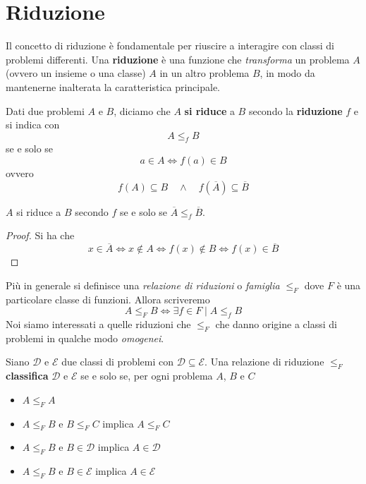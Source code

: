 \section{Riduzione}
Il concetto di riduzione è fondamentale per riuscire a interagire
con classi di problemi differenti. Una \textbf{riduzione} è una
funzione che \emph{transforma} un problema $A$ (ovvero un insieme
o una classe) $A$ in un altro problema $B$, in modo da mantenerne
inalterata la caratteristica principale.

\begin{definition} \label{def: riduzione}
	Dati due problemi $A$ e $B$, diciamo che $A$ \textbf{si riduce}
	a $B$ secondo la \textbf{riduzione} $f$ e si indica con
	\[ A \leq_f B \]
	se e solo se
	\[ a \in A \iff f(a) \in B \]
	ovvero
	\[
		f(A) \subseteq B \quad \land
		\quad f(\overline{A}) \subseteq \overline{B}
	\]
\end{definition}

\begin{property}
	$A$ si riduce a $B$ secondo $f$ se e solo se
	$\overline{A} \leq_f \overline{B}$.
	\begin{proof}
		Si ha che
		\[
			x \in \overline{A} \iff x \notin A \iff
			f(x) \notin B \iff f(x) \in \overline{B}
		\]
	\end{proof}
\end{property}

Più in generale si definisce una \emph{relazione di riduzioni}
o \emph{famiglia} $\leq_F$ dove $F$ è una particolare classe di
funzioni. Allora scriveremo
\[ A \leq_F B \iff \exists f \in F \mid A \leq_f B \]
Noi siamo interessati a quelle riduzioni che $\leq_F$ che danno
origine a classi di problemi in qualche modo \emph{omogenei}.

\begin{lemma} \label{def: classificazione}
	Siano $\mathcal{D}$ e $\mathcal{E}$ due classi di problemi
	con $\mathcal{D} \subseteq \mathcal{E}$. Una relazione di
	riduzione $\leq_F$ \textbf{classifica} $\mathcal{D}$ e
	$\mathcal{E}$ se e solo se, per ogni problema $A$, $B$ e $C$
	\begin{itemize}
		\item $A \leq_F A$
		\item $A \leq_F B$ e $B \leq_F C$ implica $A \leq_F C$
		\item $A \leq_F B$ e $B \in \mathcal{D}$ implica
		      $A \in \mathcal{D}$
		\item $A \leq_F B$ e $B \in \mathcal{E}$ implica
		      $A \in \mathcal{E}$
	\end{itemize}
\end{lemma}

